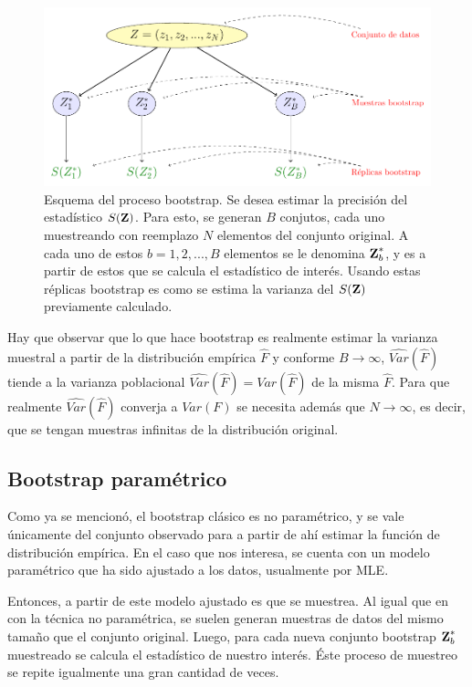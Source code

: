 \begin{figure}[tp]
  \centerline
  {\includegraphics[width=1.1\linewidth]{gfx/chap4/untitled}}        
  \caption{Esquema del proceso bootstrap. Se desea estimar la precisión del estadístico $S(\textbf{Z})$. Para esto, se generan $B$ conjutos, cada uno muestreando con reemplazo $N$ elementos del conjunto original. A cada uno de estos $b = 1, 2, ..., B$ elementos se le denomina $\textbf{Z}^{*}_b$, y es a partir de estos que se calcula el estadístico de interés. Usando estas réplicas bootstrap es como se estima la varianza del $S(\textbf{Z})$ previamente calculado.}
  \label{fig:bootesq}
\end{figure}

Hay que observar que lo que hace bootstrap es realmente estimar la varianza muestral a partir de la distribución empírica $\hat F$ y conforme $B \rightarrow \infty$, $\widehat{Var}(\hat F)$ tiende a la varianza poblacional $\widehat{Var}(\hat F) = {Var}(\hat F)$ de la misma $\hat F$. Para que realmente $\widehat{Var}(\hat F)$ converja a  ${Var}(F)$ se necesita además que $N \rightarrow \infty$, es decir, que se tengan muestras infinitas de la distribución original.

\subsection{Bootstrap paramétrico}

Como ya se mencionó, el bootstrap clásico es no paramétrico, y se vale únicamente del conjunto observado para a partir de ahí estimar la función de distribución empírica. En el caso que nos interesa, se cuenta con un modelo paramétrico que ha sido ajustado a los datos, usualmente por \ac{MLE}. 

Entonces, a partir de este modelo ajustado es que se muestrea. Al igual que en con la técnica no paramétrica, se suelen generan muestras de datos del mismo tamaño que el conjunto original. Luego, para cada nueva conjunto bootstrap $\textbf{Z}^{*}_b$ muestreado se calcula el estadístico de nuestro interés. Éste proceso de muestreo se repite igualmente una gran cantidad de veces. 

